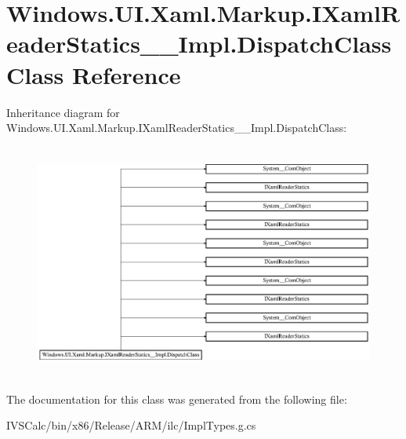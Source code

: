 \hypertarget{class_windows_1_1_u_i_1_1_xaml_1_1_markup_1_1_i_xaml_reader_statics_____impl_1_1_dispatch_class}{}\section{Windows.\+U\+I.\+Xaml.\+Markup.\+I\+Xaml\+Reader\+Statics\+\_\+\+\_\+\+Impl.\+Dispatch\+Class Class Reference}
\label{class_windows_1_1_u_i_1_1_xaml_1_1_markup_1_1_i_xaml_reader_statics_____impl_1_1_dispatch_class}
Inheritance diagram for Windows.\+U\+I.\+Xaml.\+Markup.\+I\+Xaml\+Reader\+Statics\+\_\+\+\_\+\+Impl.\+Dispatch\+Class\+:\begin{figure}[H]
\begin{center}
\leavevmode
\includegraphics[height=7.758186cm]{class_windows_1_1_u_i_1_1_xaml_1_1_markup_1_1_i_xaml_reader_statics_____impl_1_1_dispatch_class}
\end{center}
\end{figure}


The documentation for this class was generated from the following file\+:\begin{DoxyCompactItemize}
\item 
I\+V\+S\+Calc/bin/x86/\+Release/\+A\+R\+M/ilc/Impl\+Types.\+g.\+cs\end{DoxyCompactItemize}
